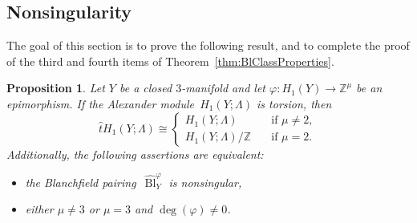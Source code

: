 \documentclass[10.9pt,a4paper]{amsart}
\newtheorem{proposition}[theorem]{Proposition}
\theoremstyle{definition}
\theoremstyle{remark}
\newcommand{\Z}{\mathbb{Z}}
\newcommand{\Bl}{\operatorname{Bl}}
\begin{document}
\subsection{Nonsingularity}
\label{sub:NonSing}


The goal of this section is to prove the following result,  and to complete the proof of the third and fourth items of Theorem~\ref{thm:BlClassProperties}.

\begin{proposition}
\label{prop:NonSingTorsionY}
Let $Y$ be a closed $3$-manifold and let $\varphi \colon H_1(Y) \to \Z^\mu$ be an epimorphism.
If the Alexander module~$H_1(Y;\Lambda)$ is torsion, then 
 $$\hat{t} H_1(Y;\Lambda)
\cong
\begin{cases}
 H_1(Y;\Lambda) &\quad \text{if } \mu \neq 2, \\
H_1(Y;\Lambda)/\Z &\quad \text{if } \mu=2.
\end{cases}
$$
Additionally,  the following assertions are equivalent:
\begin{itemize}
\item the Blanchfield pairing~$\hat{\Bl}^{\varphi}_Y$ is nonsingular,
\item either $\mu \neq 3$ or $\mu=3$ and $\deg(\varphi) \neq 0$.
\end{itemize}
\end{proposition}
\end{document}
